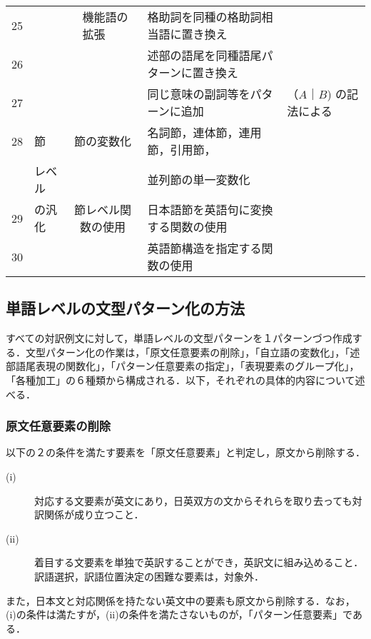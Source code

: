 \documentclass{nlp}
\begin{document}
\begin{table}[!htbp]
\begin{center}
\begin{tabular}{|c|l|p{7mm}|l|l|l|}
25 & & & 機能語の拡張 & 格助詞を同種の格助詞相当語に置き換え & \\ \cline{1-1}\cline{5-6}
26 & & & & 述部の語尾を同種語尾パターンに置き換え & \\ \cline{1-1}\cline{5-6}
27 & & & & 同じ意味の副詞等をパターンに追加 & （$A$｜$B$) の記法による \\ \hline
28 & 節 & \multicolumn{2}{|c|}{ 節の変数化 } & 名詞節，連体節，連用節，引用節， & \\
 & レベル & \multicolumn{2}{|c|}{ } & 並列節の単一変数化 & \\ \cline{1-1}\cline{3-6}
29 & の汎化 & \multicolumn{2}{|c|}{ 節レベル関数の使用 } & 日本語節を英語句に変換する関数の使用 & \\ \cline{1-1}\cline{5-6}
30 & & \multicolumn{2}{|c|}{ } & 英語節構造を指定する関数の使用 & \\
\hline
\end{tabular}
\end{center}
\end{table} 

\subsection{単語レベルの文型パターン化の方法}

すべての対訳例文に対して，単語レベルの文型パターンを１パターンづつ作成する．文型パターン化の作業は，「原文任意要素の削除」，「自立語の変数化」，「述部語尾表現の関数化」，「パターン任意要素の指定」，「表現要素のグループ化」，「各種加工」の６種類から構成される．以下，それぞれの具体的内容について述べる．

\subsubsection{原文任意要素の削除}
以下の２の条件を満たす要素を「原文任意要素」と判定し，原文から削除する．

\begin{description}
\item[(i)]対応する文要素が英文にあり，日英双方の文からそれらを取り去っても対訳関係が成り立つこと．

\item[(ii)]着目する文要素を単独で英訳することができ，英訳文に組み込めること．訳語選択，訳語位置決定の困難な要素は，対象外．
\end{description}

また，日本文と対応関係を持たない英文中の要素も原文から削除する．なお，(i)の条件は満たすが，(ii)の条件を満たさないものが，「パターン任意要素」である．
\end{document}
